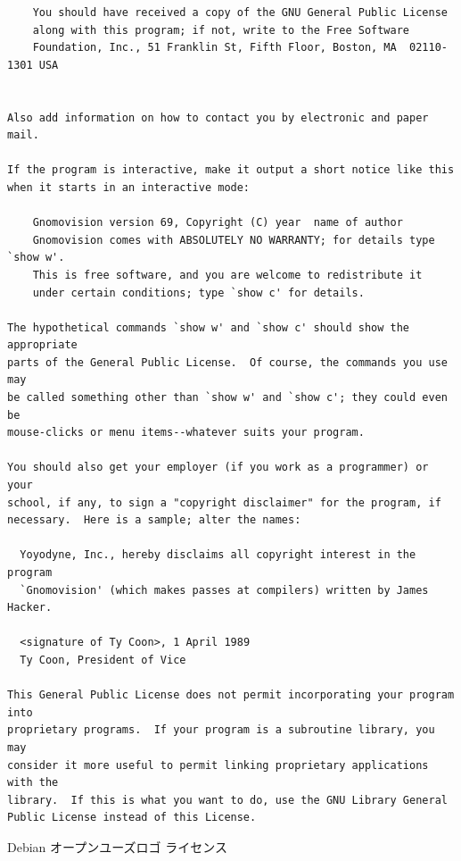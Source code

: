\documentclass[mingoth,a4paper]{jsarticle}
\begin{document}
\begin{multicols}{2}
\begin{fontsize}{6}{6}
\begin{verbatim}
    You should have received a copy of the GNU General Public License
    along with this program; if not, write to the Free Software
    Foundation, Inc., 51 Franklin St, Fifth Floor, Boston, MA  02110-1301 USA


Also add information on how to contact you by electronic and paper mail.

If the program is interactive, make it output a short notice like this
when it starts in an interactive mode:

    Gnomovision version 69, Copyright (C) year  name of author
    Gnomovision comes with ABSOLUTELY NO WARRANTY; for details type `show w'.
    This is free software, and you are welcome to redistribute it
    under certain conditions; type `show c' for details.

The hypothetical commands `show w' and `show c' should show the appropriate
parts of the General Public License.  Of course, the commands you use may
be called something other than `show w' and `show c'; they could even be
mouse-clicks or menu items--whatever suits your program.

You should also get your employer (if you work as a programmer) or your
school, if any, to sign a "copyright disclaimer" for the program, if
necessary.  Here is a sample; alter the names:

  Yoyodyne, Inc., hereby disclaims all copyright interest in the program
  `Gnomovision' (which makes passes at compilers) written by James Hacker.

  <signature of Ty Coon>, 1 April 1989
  Ty Coon, President of Vice

This General Public License does not permit incorporating your program into
proprietary programs.  If your program is a subroutine library, you may
consider it more useful to permit linking proprietary applications with the
library.  If this is what you want to do, use the GNU Library General
Public License instead of this License.
 \end{verbatim}
 \end{fontsize}
\end{multicols}

\begin{center}
Debian オープンユーズロゴ ライセンス
\end{center}
\end{document}
